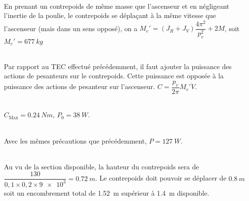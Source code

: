 \ifprof
\begin{corrige}~\\
En prenant un contrepoids de même masse que l'ascenseur et en négligeant l'inertie de la poulie, le contrepoids se déplaçant à la même vitesse que l'ascenseur (mais dans un sens opposé), on a
$M_e' = \left( J_R+J_V\right) \dfrac{4\pi^2}{p_v^2} +2M$, soit $M_e' = \SI{677}{kg}$
\end{corrige}
\else
\fi

\ifprof
\begin{corrige}~\\
Par rapport au TEC effectué précédemment, il faut ajouter la puissance des actions de pesanteurs sur le contrepoids.
Cette puissance est opposée à la puissance des actions de pesanteur sur l'ascenseur.
 $C = \dfrac{p_v}{2\pi}M_e' \dot{V}$.
 
\end{corrige}
\else
\fi

\ifprof
\begin{corrige}~\\
$C_{\text{Max}} = \SI{0,24}{Nm}$, $P_0 = \SI{38}{W}$.

\end{corrige}
\else
\fi

\ifprof
\begin{corrige}~\\
Avec les mêmes précautions que précédemment, $P=\SI{127}{W}$. 
\end{corrige}
\else
\fi



\ifprof
\begin{corrige}~\\
Au vu de la section disponible, la hauteur du contrepoids sera de $\dfrac{130}{0,1\times 0,2 \times \num{9e3}}=\SI{0,72}{m}$. Le contrepoids doit pouvoir se déplacer de $\SI{0,8}{m}$ soit un encombrement total de \SI{1,52}{m}  supérieur à \SI{1,4}{m} disponible.
\end{corrige}
\else
\fi

